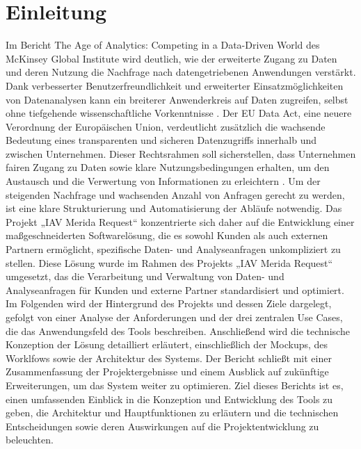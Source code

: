 \chapter{Einleitung}
\label{chap:einleitung}
Im Bericht \glqq The Age of Analytics: Competing in a Data-Driven World\grqq{} des McKinsey Global Institute wird deutlich, wie der erweiterte Zugang zu Daten und deren Nutzung die Nachfrage nach datengetriebenen Anwendungen verstärkt. Dank verbesserter Benutzerfreundlichkeit und erweiterter Einsatzmöglichkeiten von Datenanalysen kann ein breiterer Anwenderkreis auf Daten zugreifen, selbst ohne tiefgehende wissenschaftliche Vorkenntnisse \cite{mckinsey2016analytics}.
\newline
Der EU Data Act, eine neuere Verordnung der Europäischen Union, verdeutlicht zusätzlich die wachsende Bedeutung eines transparenten und sicheren Datenzugriffs innerhalb und zwischen Unternehmen. Dieser Rechtsrahmen soll sicherstellen, dass Unternehmen fairen Zugang zu Daten sowie klare Nutzungsbedingungen erhalten, um den Austausch und die Verwertung von Informationen zu erleichtern \cite{EUData_JohnerInstitut}.
\newline
\newline
Um der steigenden Nachfrage und wachsenden Anzahl von Anfragen gerecht zu werden, ist eine klare Strukturierung und Automatisierung der Abläufe notwendig. Das Projekt „IAV Merida Request“ konzentrierte sich daher auf die Entwicklung einer maßgeschneiderten Softwarelösung, die es sowohl Kunden als auch externen Partnern ermöglicht, spezifische Daten- und Analyseanfragen unkompliziert zu stellen. Diese Lösung wurde im Rahmen des Projekts „IAV Merida Request“ umgesetzt, das die Verarbeitung und Verwaltung von Daten- und Analyseanfragen für Kunden und externe Partner standardisiert und optimiert.
\newline
Im Folgenden wird der Hintergrund des Projekts und dessen Ziele dargelegt, gefolgt von einer Analyse der Anforderungen und der drei zentralen Use Cases, die das Anwendungsfeld des Tools beschreiben. Anschließend wird die technische Konzeption der Lösung detailliert erläutert, einschließlich der Mockups, des Worklfows sowie der Architektur des Systems. Der Bericht schließt mit einer Zusammenfassung der Projektergebnisse und einem Ausblick auf zukünftige Erweiterungen, um das System weiter zu optimieren.
\newline
\newline
Ziel dieses Berichts ist es, einen umfassenden Einblick in die Konzeption und Entwicklung des Tools zu geben, die Architektur und Hauptfunktionen zu erläutern und die technischen Entscheidungen sowie deren Auswirkungen auf die Projektentwicklung zu beleuchten.






